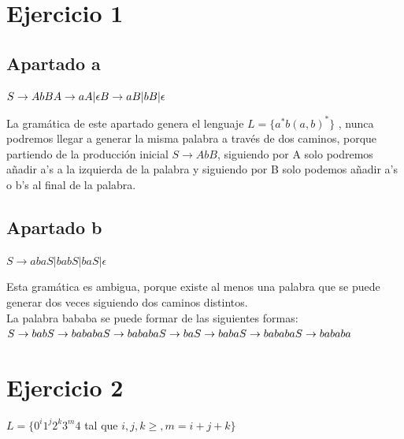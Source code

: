 \documentclass[12pt, spanish]{article}
\begin{document}
\section{Ejercicio 1}
\subsection{Apartado a}
\begin{math}
S\rightarrow AbB\\
A\rightarrow aA | \epsilon\\
B\rightarrow aB|bB|\epsilon
\end{math}

La gramática de este apartado genera el lenguaje \begin{math}
L = \{a^{*}b(a,b)^{*}\}
\end{math}
, nunca podremos llegar a generar la misma palabra a través de dos caminos, porque partiendo de la producción inicial  \begin{math} S \rightarrow AbB \end{math}, siguiendo por A solo podremos añadir a's a la izquierda de la palabra y siguiendo por B solo podemos añadir a's o b's al final de la palabra.

\subsection{Apartado b}
\begin{math}
S \rightarrow abaS|babS|baS|\epsilon
\end{math}

Esta gramática es ambigua, porque existe al menos una palabra que se puede generar dos veces siguiendo dos caminos distintos.\\
La palabra bababa se puede formar de las siguientes formas:\\
\begin{math}
S \rightarrow babS \rightarrow bababaS \rightarrow bababa\\
S \rightarrow baS \rightarrow babaS \rightarrow bababaS \rightarrow bababa
\end{math}

\section{Ejercicio 2}

\begin{math}
L = \{0^{i}1^{j}2^{k}3^{m}4 \end{math} tal que \begin{math} i,j,k \ge, m = i+j+k\}
\end{math}
\end{document}

